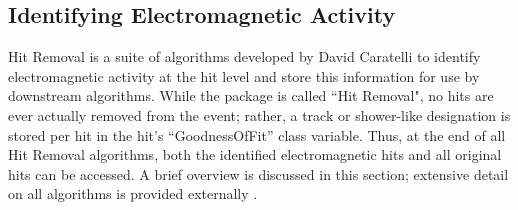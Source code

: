 \subsection{Identifying Electromagnetic Activity}

Hit Removal is a suite of algorithms developed by David Caratelli to identify electromagnetic activity at the hit level and store this information for use by downstream algorithms. While the package is called ``Hit Removal", no hits are ever actually removed from the event; rather, a track or shower-like designation is stored per hit in the hit's ``GoodnessOfFit'' class variable. Thus, at the end of all Hit Removal algorithms, both the identified electromagnetic hits and all original hits can be accessed. A brief overview is discussed in this section; extensive detail on all algorithms is provided externally \cite{bib:davidc_hitremoval}.

